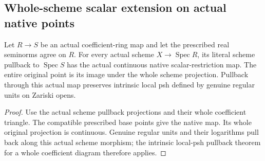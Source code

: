 \subsection{Whole-scheme scalar extension on actual native points}

\begin{lemma}
\label{lem:fc-scheme-scalar-pullback}
\leanok
{}
Let $R\to S$ be an actual coefficient-ring map and let the prescribed
real seminorms agree on $R$. For every actual scheme
$X\to\operatorname{Spec}R$, its literal scheme pullback to
$\operatorname{Spec}S$ has the actual continuous native scalar-restriction
map. The entire original point is its image under the whole scheme
projection. Pullback through this actual map preserves intrinsic local
psh defined by genuine regular units on Zariski opens.
\end{lemma}
\begin{proof}
Use the actual scheme pullback projections and their whole coefficient
triangle. The compatible prescribed base points give the native map.
Its whole original projection is continuous. Genuine regular units and
their logarithms pull back along this actual scheme morphism; the
intrinsic local-psh pullback theorem for a whole coefficient diagram
therefore applies.
\end{proof}

